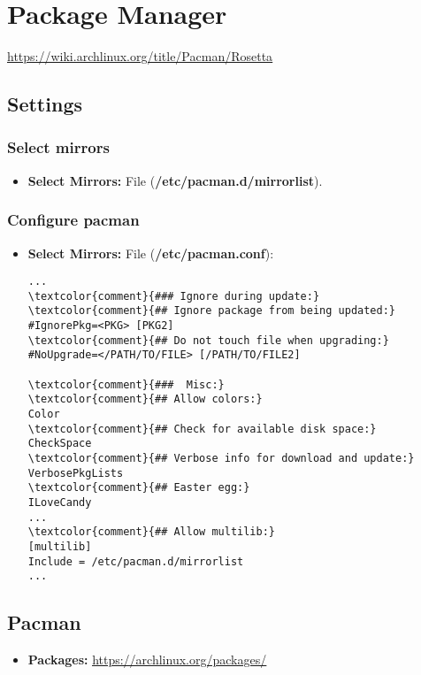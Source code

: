 \documentclass[10pt, a4paper, onecolumn, openany]{book} %
\begin{document}
\chapter{Package Manager}
\underline{\href{https://wiki.archlinux.org/title/Pacman/Rosetta}{https://wiki.archlinux.org/title/Pacman/Rosetta}}
\section{Settings}
\subsection{Select mirrors}
\begin{itemize}
    \item \textbf{Select Mirrors:}
\newline File (\textbf{\textcolor{file}{/etc/pacman.d/mirrorlist}}).
\end{itemize}
\subsection{Configure pacman}
\begin{itemize}
    \item \textbf{Select Mirrors:}
\newline File (\textbf{\textcolor{file}{/etc/pacman.conf}}):
\begin{Verbatim}[commandchars=\\\{\}]
...
\textcolor{comment}{### Ignore during update:}
\textcolor{comment}{## Ignore package from being updated:}
#IgnorePkg=<PKG> [PKG2]
\textcolor{comment}{## Do not touch file when upgrading:}
#NoUpgrade=</PATH/TO/FILE> [/PATH/TO/FILE2]

\textcolor{comment}{###  Misc:}
\textcolor{comment}{## Allow colors:}
Color
\textcolor{comment}{## Check for available disk space:}
CheckSpace
\textcolor{comment}{## Verbose info for download and update:}
VerbosePkgLists
\textcolor{comment}{## Easter egg:}
ILoveCandy
...
\textcolor{comment}{## Allow multilib:}
[multilib]
Include = /etc/pacman.d/mirrorlist
...
\end{Verbatim}
\end{itemize}
\section{Pacman}
\begin{itemize}
    \item \textbf{Packages:}
\newline \underline{\href{https://archlinux.org/packages/}{https://archlinux.org/packages/}}
\end{itemize}
\end{document}
